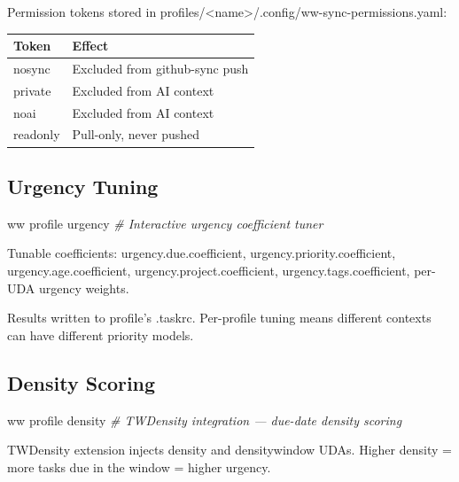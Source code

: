 \documentclass[11pt, a4paper, DIV=14]{scrartcl}
\renewcommand{\texttt}[1]{{\ttfamily\fontsize{8.5}{10.5}\selectfont\color{BabbNavy}#1}}
\newenvironment{Shaded}{%
  \vspace{4pt}%
  \begin{lrbox}{\ShadedBox}%
  \begin{minipage}{\dimexpr\linewidth-2\fboxsep\relax}%
  \vspace{4pt}%
}{%
  \vspace{4pt}%
  \end{minipage}%
  \end{lrbox}%
  \noindent\colorbox{CodeBg}{\usebox{\ShadedBox}}%
  \par\vspace{4pt}%
}
\newcommand{\CommentTok}[1]{\textcolor{BabbGray}{\textit{#1}}}
\newcommand{\ExtensionTok}[1]{#1}
\newcommand{\NormalTok}[1]{#1}
\newenvironment{Highlighting}{\ttfamily\fontsize{8.2}{11}\selectfont}{}
\newcounter{none}
\begin{document}
Permission tokens stored in
\texttt{profiles/\textless{}name\textgreater{}/.config/ww-sync-permissions.yaml}:

{\def\LTcaptype{none} %
\begin{longtable}[]{@{}ll@{}}
\toprule\noalign{}
Token & Effect \\
\midrule\noalign{}
\endhead
\bottomrule\noalign{}
\endlastfoot
\texttt{nosync} & Excluded from github-sync push \\
\texttt{private} & Excluded from AI context \\
\texttt{noai} & Excluded from AI context \\
\texttt{readonly} & Pull-only, never pushed \\
\end{longtable}
}

\subsection{Urgency Tuning}\label{urgency-tuning}

\begin{Shaded}
\begin{Highlighting}[]
\ExtensionTok{ww}\NormalTok{ profile urgency    }\CommentTok{\# Interactive urgency coefficient tuner}
\end{Highlighting}
\end{Shaded}

Tunable coefficients: \texttt{urgency.due.coefficient},
\texttt{urgency.priority.coefficient}, \texttt{urgency.age.coefficient},
\texttt{urgency.project.coefficient}, \texttt{urgency.tags.coefficient},
per-UDA urgency weights.

Results written to profile's \texttt{.taskrc}. Per-profile tuning means
different contexts can have different priority models.

\subsection{Density Scoring}\label{density-scoring}

\begin{Shaded}
\begin{Highlighting}[]
\ExtensionTok{ww}\NormalTok{ profile density    }\CommentTok{\# TWDensity integration — due{-}date density scoring}
\end{Highlighting}
\end{Shaded}

TWDensity extension injects \texttt{density} and \texttt{densitywindow}
UDAs. Higher density = more tasks due in the window = higher urgency.
\end{document}
